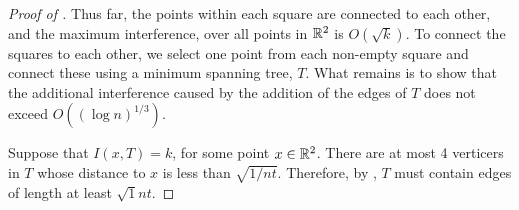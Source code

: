 \documentclass{patmorin}
\begin{document}
\begin{proof}[Proof of ]
Thus far, the points within each square are connected to each other, and
the maximum interference, over all points in $\mathbb{R}^2$ is $O(\sqrt{k})$.
To connect the squares to each other, we select one point from each
non-empty square and connect these using a minimum spanning tree, $T$.
What remains is to show that the additional interference caused by the
addition of the edges of $T$ does not exceed $O((\log n)^{1/3})$.

Suppose that $I(x,T)=k$, for some point $x\in\mathbb{R}^2$.  There are at most 4 verticers in $T$ whose distance to $x$ is less than $\sqrt{1/nt}$.  Therefore, by , $T$ must contain edges of length at least $\sqrt{1}{nt}$.


\end{proof}
\end{document}
